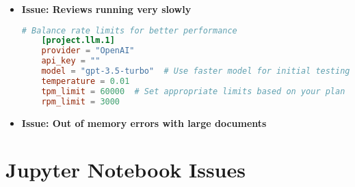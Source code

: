\begin{itemize}
    \item \textbf{Issue: Reviews running very slowly}

    \begin{configbox}
    \begin{lstlisting}[language=TOML]
    # Balance rate limits for better performance
    [project.llm.1]
    provider = "OpenAI"
    api_key = ""
    model = "gpt-3.5-turbo"  # Use faster model for initial testing
    temperature = 0.01
    tpm_limit = 60000  # Set appropriate limits based on your plan
    rpm_limit = 3000
    \end{lstlisting}
    \end{configbox}


    \item \textbf{Issue: Out of memory errors with large documents}

\end{itemize}

\section{Jupyter Notebook Issues}

